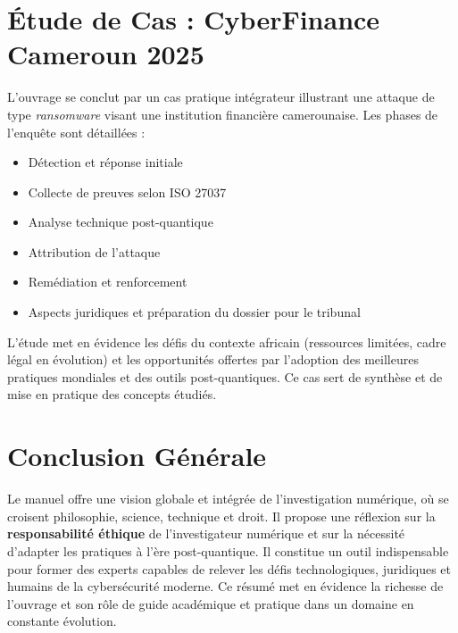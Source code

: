 \documentclass[12pt,a4paper]{article}
\begin{document}
\section{ \centering \huge Étude de Cas : CyberFinance Cameroun 2025}
{\Large L’ouvrage se conclut par un cas pratique intégrateur illustrant une attaque de type \textit{ransomware} visant une institution financière camerounaise. Les phases de l’enquête sont détaillées :
\begin{itemize}
	\item Détection et réponse initiale
	\item Collecte de preuves selon ISO 27037
	\item Analyse technique post-quantique
	\item Attribution de l'attaque
	\item Remédiation et renforcement
	\item Aspects juridiques et préparation du dossier pour le tribunal
\end{itemize}
L’étude met en évidence les défis du contexte africain (ressources limitées, cadre légal en évolution) et les opportunités offertes par l’adoption des meilleures pratiques mondiales et des outils post-quantiques. Ce cas sert de synthèse et de mise en pratique des concepts étudiés.}

\section*{\centering \huge Conclusion Générale}
{\Large Le manuel offre une vision globale et intégrée de l’investigation numérique, où se croisent philosophie, science, technique et droit. Il propose une réflexion sur la \textbf{responsabilité éthique} de l’investigateur numérique et sur la nécessité d’adapter les pratiques à l’ère post-quantique. Il constitue un outil indispensable pour former des experts capables de relever les défis technologiques, juridiques et humains de la cybersécurité moderne. Ce résumé met en évidence la richesse de l’ouvrage et son rôle de guide académique et pratique dans un domaine en constante évolution.}
	
\end{document}
